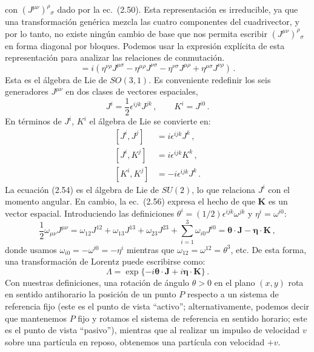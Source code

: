 \documentclass[a4paper,11pt]{book} %
\begin{document}
con $(J^{\mu\nu})^\rho{}_\sigma$ dado por la ec.\ (2.50). Esta representación es irreducible, ya que una transformación genérica mezcla las cuatro componentes del cuadrivector, y por lo tanto, no existe ningún cambio de base que nos permita escribir $(J^{\mu\nu})^\rho{}_\sigma$ en forma diagonal por bloques. 
\medskip\newline
Podemos usar la expresión explícita de esta representación para analizar las relaciones de conmutación.
\begin{equation}
    [J^{\mu\nu}, J^{\rho\sigma}] = i\left(\eta^{\nu\rho}J^{\mu\sigma} - \eta^{\mu\rho}J^{\nu\sigma} - \eta^{\nu\sigma}J^{\mu\rho} + \eta^{\mu\sigma}J^{\nu\rho}\right)\,.
\end{equation}
Esta es el álgebra de Lie de $SO(3,1)$. Es conveniente redefinir los seis generadores $J^{\mu\nu}$ en dos clases de vectores espaciales,
\begin{equation}
    J^i = \frac{1}{2}\epsilon^{ijk}J^{jk}\,,\qquad K^i = J^{i0}\,.
\end{equation}
En términos de $J^i$, $K^i$ el álgebra de Lie se convierte en:
\begin{align}
    \left[J^i, J^j\right] &= i\epsilon^{ijk}J^k\,,\\
    \left[J^i, K^j\right] &= i\epsilon^{ijk}K^k\,, \\
    \left[K^i, K^j\right] &= -i\epsilon^{ijk}J^k\,.
\end{align}
La ecuación (2.54) es el álgebra de Lie de $SU(2)$, lo que relaciona $J^i$ con el momento angular. En cambio, la ec.\ (2.56) expresa el hecho de que $\mathbf{K}$ es un vector espacial.
 \medskip\newline
Introduciendo las definiciones $\theta^i = (1/2)\epsilon^{ijk}\omega^{jk}$ y $\eta^i = \omega^{i0}$:
\begin{equation}
    \frac{1}{2}\omega_{\mu\nu}J^{\mu\nu} = \omega_{12}J^{12} + \omega_{13}J^{13} + \omega_{23}J^{23} + \sum_{i=1}^{3}\omega_{i0}J^{i0}
    = \boldsymbol{\theta}\cdot\mathbf{J} - \boldsymbol{\eta}\cdot\mathbf{K}\,,
\end{equation}
donde usamos $\omega_{i0} = -\omega^{i0} = -\eta^i$ mientras que $\omega_{12} = \omega^{12} = \theta^3$, etc. De esta forma, una transformación de Lorentz puede escribirse como:
\begin{equation}
    \Lambda = \exp\{-i\boldsymbol{\theta}\cdot\mathbf{J} + i\boldsymbol{\eta}\cdot\mathbf{K}\}\,.
\end{equation}
Con nuestras definiciones, una rotación de ángulo $\theta > 0$ en el plano $(x,y)$ rota en sentido antihorario la posición de un punto $P$ respecto a un sistema de referencia fijo (este es el punto de vista ``activo''; alternativamente, podemos decir que mantenemos $P$ fijo y rotamos el sistema de referencia en sentido horario; este es el punto de vista ``pasivo''), mientras que al realizar un impulso de velocidad $v$ sobre una partícula en reposo, obtenemos una partícula con velocidad $+v$. 
\end{document}
